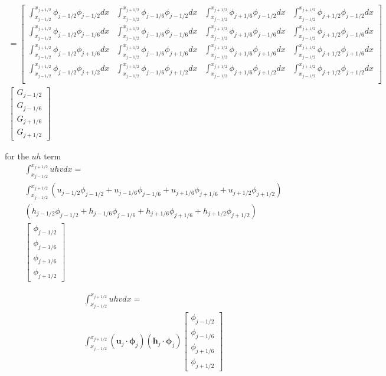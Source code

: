\documentclass{article}
\newcommand{\vecn}[1]{\boldsymbol{#1}}
\begin{document}
\begin{multline}
=  \begin{bmatrix}
\int_{x_{j-1/2}}^{x_{j+1/2}}  \phi_{j-1/2}\phi_{j-1/2}  dx &  \int_{x_{j-1/2}}^{x_{j+1/2}} \phi_{j-1/6}\phi_{j-1/2}  dx&  \int_{x_{j-1/2}}^{x_{j+1/2}} \phi_{j+1/6}\phi_{j-1/2}  dx & \int_{x_{j-1/2}}^{x_{j+1/2}} \phi_{j+1/2}\phi_{j-1/2} dx \\
\int_{x_{j-1/2}}^{x_{j+1/2}}  \phi_{j-1/2}\phi_{j-1/6}  dx &  \int_{x_{j-1/2}}^{x_{j+1/2}} \phi_{j-1/6}\phi_{j-1/6}  dx&  \int_{x_{j-1/2}}^{x_{j+1/2}} \phi_{j+1/6}\phi_{j-1/6}  dx & \int_{x_{j-1/2}}^{x_{j+1/2}} \phi_{j+1/2}\phi_{j-1/6} dx \\
\int_{x_{j-1/2}}^{x_{j+1/2}}  \phi_{j-1/2}\phi_{j+1/6}  dx &  \int_{x_{j-1/2}}^{x_{j+1/2}} \phi_{j-1/6}\phi_{j+1/6}  dx&  \int_{x_{j-1/2}}^{x_{j+1/2}} \phi_{j+1/6}\phi_{j+1/6}  dx & \int_{x_{j-1/2}}^{x_{j+1/2}} \phi_{j+1/2}\phi_{j+1/6} dx \\
\int_{x_{j-1/2}}^{x_{j+1/2}}  \phi_{j-1/2}\phi_{j+1/2}  dx &  \int_{x_{j-1/2}}^{x_{j+1/2}} \phi_{j-1/6}\phi_{j+1/2}  dx&  \int_{x_{j-1/2}}^{x_{j+1/2}} \phi_{j+1/6}\phi_{j+1/2}  dx & \int_{x_{j-1/2}}^{x_{j+1/2}} \phi_{j+1/2}\phi_{j+1/2} dx \\
\end{bmatrix} \\ \begin{bmatrix}
G_{j-1/2} \\ G_{j-1/6} \\ G_{j+1/6}   \\ G_{j+1/2}
\end{bmatrix} 
\end{multline}


for the $uh$ term
\begin{multline}
\int_{x_{j-1/2}}^{x_{j+1/2}} uhv dx = \\
 \int_{x_{j-1/2}}^{x_{j+1/2}} \left(u_{j-1/2}\phi_{j-1/2} + u_{j-1/6}\phi_{j-1/6} + u_{j+1/6}\phi_{j+1/6}  + u_{j+1/2}\phi_{j+1/2}\right) \\
  \left(h_{j-1/2}\phi_{j-1/2} + h_{j-1/6}\phi_{j-1/6} + h_{j+1/6}\phi_{j+1/6}  + h_{j+1/2}\phi_{j+1/2}\right) \\ \begin{bmatrix}
\phi_{j-1/2} \\ \phi_{j-1/6}\\ \phi_{j+1/6} \\\phi_{j+1/2}
\end{bmatrix} 
\end{multline}


\begin{multline}
\int_{x_{j-1/2}}^{x_{j+1/2}} uhv dx = \\
\int_{x_{j-1/2}}^{x_{j+1/2}} \left(\vecn{u}_j \cdot \vecn{\phi}_j\right) \left(\vecn{h}_j \cdot \vecn{\phi}_j\right)  \begin{bmatrix}
\phi_{j-1/2} \\ \phi_{j-1/6}\\ \phi_{j+1/6} \\\phi_{j+1/2}
\end{bmatrix} 
\end{multline}
\end{document}
